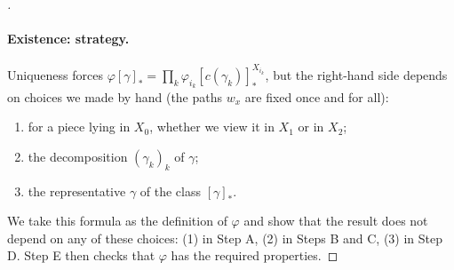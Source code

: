 \begin{proof}[]
  \paragraph{Existence: strategy.} Uniqueness forces $\varphi[\gamma]_*=\prod_k\varphi_{i_k}[c(\gamma_k)]_*^{X_{i_k}}$, but the right-hand side depends on choices we made by hand (the paths $w_x$ are fixed once and for all):
  \begin{enumerate}
    \item[(1)] for a piece lying in $X_0$, whether we view it in $X_1$ or in $X_2$;
    \item[(2)] the decomposition $(\gamma_k)_k$ of $\gamma$;
    \item[(3)] the representative $\gamma$ of the class $[\gamma]_*$.
  \end{enumerate}
  We take this formula as the definition of $\varphi$ and show that the result does not depend on any of these choices: (1) in Step A, (2) in Steps B and C, (3) in Step D. Step E then checks that $\varphi$ has the required properties.


\end{proof}
